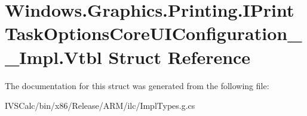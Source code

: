 \hypertarget{struct_windows_1_1_graphics_1_1_printing_1_1_i_print_task_options_core_u_i_configuration_____impl_1_1_vtbl}{}\section{Windows.\+Graphics.\+Printing.\+I\+Print\+Task\+Options\+Core\+U\+I\+Configuration\+\_\+\+\_\+\+Impl.\+Vtbl Struct Reference}
\label{struct_windows_1_1_graphics_1_1_printing_1_1_i_print_task_options_core_u_i_configuration_____impl_1_1_vtbl}


The documentation for this struct was generated from the following file\+:\begin{DoxyCompactItemize}
\item 
I\+V\+S\+Calc/bin/x86/\+Release/\+A\+R\+M/ilc/Impl\+Types.\+g.\+cs\end{DoxyCompactItemize}
